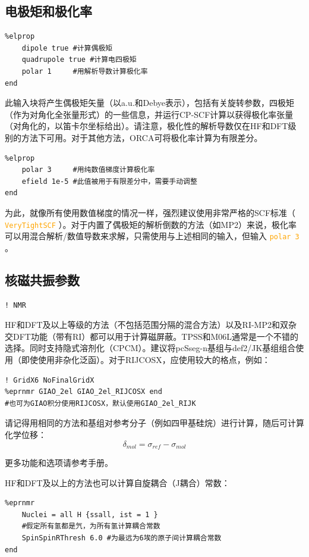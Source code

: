 \documentclass{ctexart}
\newcommand{\cmd}[1]{\textcolor{orange}{ \texttt{#1} }}
\begin{document}
	\subsection{电极矩和极化率} 
	
	\begin{lstlisting}
%elprop 
	dipole true	#计算偶极矩
	quadrupole true	#计算电四极矩
	polar 1		#用解析导数计算极化率
end
	\end{lstlisting}
	
	此输入块将产生偶极矩矢量（以a.u.和Debye表示），包括有关旋转参数，四极矩（作为对角化全张量形式）的一些信息，并运行CP-SCF计算以获得极化率张量（对角化的，以笛卡尔坐标给出）。请注意，极化性的解析导数仅在HF和DFT级别的方法下可用。对于其他方法，ORCA可将极化率计算为有限差分。
	
	\begin{lstlisting}
%elprop 
	polar 3 	#用纯数值梯度计算极化率
	efield 1e-5	#此值被用于有限差分中，需要手动调整
end
	\end{lstlisting}
	
	为此，就像所有使用数值梯度的情况一样，强烈建议使用非常严格的SCF标准（\cmd{VeryTightSCF}）。对于内置了偶极矩的解析倒数的方法（如MP2）来说，极化率可以用混合解析/数值导数来求解，只需使用与上述相同的输入，但输入\cmd{polar 3}。
	
	\subsection{核磁共振参数} 
	\begin{lstlisting}
! NMR
	\end{lstlisting}
	HF和DFT及以上等级的方法（不包括范围分隔的混合方法）以及RI-MP2和双杂交DFT功能（带有RI）都可以用于计算磁屏蔽。TPSS和M06L通常是一个不错的选择。同时支持隐式溶剂化（CPCM）。建议将pcSseg-n基组与def2/JK基组组合使用（即使使用非杂化泛函）。对于RIJCOSX，应使用较大的格点，例如：
	\begin{lstlisting}
! GridX6 NoFinalGridX
%eprnmr GIAO_2el GIAO_2el_RIJCOSX end 
#也可为GIAO积分使用RIJCOSX，默认使用GIAO_2el_RIJK
	\end{lstlisting}
	请记得用相同的方法和基组对参考分子（例如四甲基硅烷）进行计算，随后可计算化学位移：\[\delta_{mol}=\sigma_{ref}-\sigma_{mol}\]
	
	更多功能和选项请参考手册。
	
	HF和DFT及以上的方法也可以计算自旋耦合（J耦合）常数：
	\begin{lstlisting}
%eprnmr 
	Nuclei = all H {ssall, ist = 1 } 
	#假定所有氢都是氕，为所有氢计算耦合常数
	SpinSpinRThresh 6.0	#为最远为6埃的原子间计算耦合常数
end
	\end{lstlisting}
	
\end{document}
